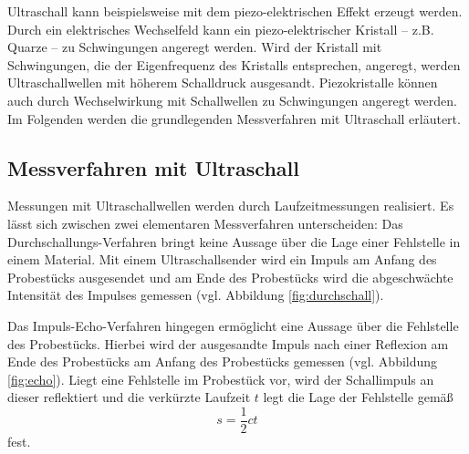 Ultraschall kann beispielsweise mit dem piezo-elektrischen Effekt erzeugt werden.
Durch ein elektrisches Wechselfeld kann ein piezo-elektrischer Kristall -- z.B. Quarze -- zu
Schwingungen angeregt werden. Wird der Kristall mit 
Schwingungen, die der Eigenfrequenz des Kristalls entsprechen, angeregt, werden 
Ultraschallwellen mit höherem Schalldruck ausgesandt. Piezokristalle können auch durch
Wechselwirkung mit Schallwellen zu Schwingungen angeregt werden.
Im Folgenden werden die grundlegenden Messverfahren mit Ultraschall erläutert.
\subsection{Messverfahren mit Ultraschall}
Messungen mit Ultraschallwellen werden durch Laufzeitmessungen realisiert.
Es lässt sich zwischen zwei elementaren Messverfahren unterscheiden:
Das Durchschallungs-Verfahren bringt keine Aussage über die Lage einer Fehlstelle in einem
Material. Mit einem Ultraschallsender wird ein Impuls am Anfang des Probestücks ausgesendet 
und am Ende des Probestücks wird die abgeschwächte Intensität des Impulses gemessen (vgl. 
Abbildung \ref{fig:durchschall}).

Das Impuls-Echo-Verfahren hingegen ermöglicht eine Aussage über die Fehlstelle des Probestücks.
Hierbei wird der ausgesandte Impuls nach einer Reflexion am Ende des Probestücks am Anfang des
Probestücks gemessen (vgl. Abbildung \ref{fig:echo}).
Liegt eine Fehlstelle im Probestück vor, wird der Schallimpuls an dieser reflektiert und die 
verkürzte Laufzeit $t$ legt die Lage der Fehlstelle gemäß
\begin{equation}
	s = \frac{1}{2} c t
\end{equation}
fest.



\cite{Anleitung}
